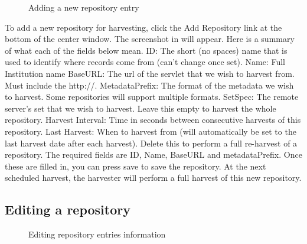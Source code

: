 \documentclass[a4paper,11pt]{article}
\begin{document}
\begin{figure}[h]
 \centering
 \caption{Adding a new repository entry}
 \label{adding_repository_information}
\end{figure}

To add a new repository for harvesting, click the Add Repository link at the bottom of the center window. The screenshot in  will appear. Here is a summary of what each of the fields below mean.
ID: The short (no spaces) name that is used to identify where records come from (can't change once set). Name: Full Institution name BaseURL: The url of the servlet that we wish to harvest from. Must include the http://. MetadataPrefix: The format of the metadata we wish to harvest. Some repositories will support multiple formats. SetSpec: The remote server's set that we wish to harvest. Leave this empty to harvest the whole repository. Harvest Interval: Time in seconds between consecutive harvests of this repository. Last Harvest: When to harvest from (will automatically be set to the last harvest date after each harvest). Delete this to perform a full re-harvest of a repository.
The required fields are ID, Name, BaseURL and metadataPrefix. Once these are filled in, you can press save to save the repository. At the next scheduled harvest, the harvester will perform a full harvest of this new repository.

\subsection{Editing a repository}

\begin{figure}[h]
 \centering
 \caption{Editing repository entries information}
 \label{editing_repository_information}
\end{figure}
\end{document}
